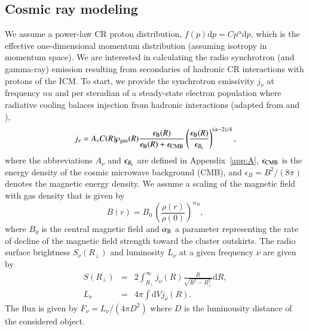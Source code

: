 \documentclass[traditabstract]{aa}
\newcommand{\rmn}{\mathrm}
\newcommand{\dd}{\mathrm{d}}
\begin{document}
\subsection{Cosmic ray modeling}
\label{sec:2.3}
We assume a power-law CR proton distribution, $f(p) \dd p=C p^\alpha \dd p$,
which is the effective one-dimensional momentum distribution (assuming isotropy
in momentum space). We are interested in calculating the radio synchrotron (and
gamma-ray) emission resulting from secondaries of hadronic CR interactions with
protons of the ICM. To start, we provide the synchrotron emissivity $j_{\nu}$ at
frequency $nu$ and per steradian of a steady-state electron population where
radiative cooling balaces injection from hadronic interactions (adapted from
\citealp{2008MNRAS.385.1211P} and \citealp{2011A&A...527A..99E}),
\begin{equation}
j_{\nu}  =  A_\nu C(R) \rho_{\rm{gas}}(R) 
\frac{\epsilon_{\rm{B}}(R)}{\epsilon_{\rm{B}}(R)+\epsilon_{\rm{CMB}}} 
\left( \frac{\epsilon_{\rm{B}}(R)}{\epsilon_{B_{\rm{c}}}} \right)^{(\alpha-2)/4},
\label{eq:jnu}
\end{equation}
where the abbreviations $A_\nu$ and $\epsilon_{B_{\rm{c}}}$ are defined in
Appendix~\ref{app:A}, $\epsilon_{\rm{CMB}}$ is the energy density of the cosmic
microwave background (CMB), and $\epsilon_B=B^{2}/(8\pi)$ denotes the magnetic
energy density. We assume a scaling of the magnetic field with gas density that
is given by
\begin{equation}
B(r) = B_0\,\left(\frac{\rho(r)}{\rho(0)}\right)^{\alpha_B},
\label{eq:B}
\end{equation}
where $B_0$ is the central magnetic field and $\alpha_{\rm{B}}$ a parameter
representing the rate of decline of the magnetic field strength toward the
cluster outskirts. The radio surface brightness $S_{\nu}(R_{\perp})$ and luminosity
$L_{\nu}$ at a given frequency $\nu$ are given by
\begin{eqnarray}
S(R_{\perp}) &=& 2 \int_{R_{\perp}}^{\infty} j_{\nu}(R) \frac{R}{\sqrt{R^{2}-R_{\perp}^{2}}} \rmn{d}R, \\
L_{\nu}  &=&  4 \pi \int \dd V j_\nu(R).
\label{eq:lum}
\end{eqnarray}
The flux is given by $F_{\nu}=L_{\nu}/(4\pi D^{2})$ where $D$ is the
luminousity distance of the considered object.

\end{document}
